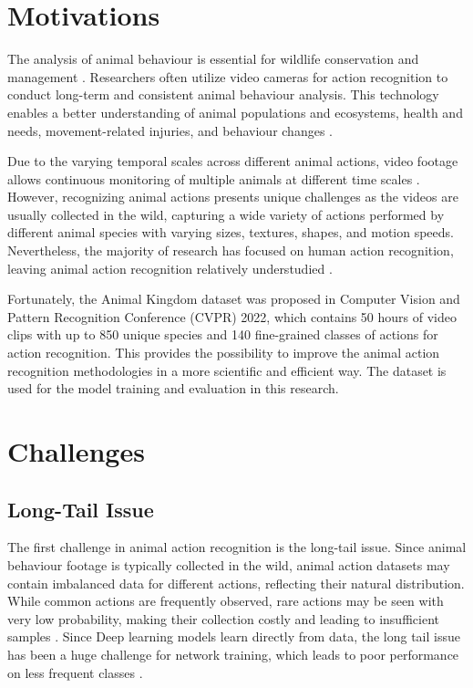 \section{Motivations}
The analysis of animal behaviour is essential for wildlife conservation and management \parencite{Greggor2019, singh2020animal}. Researchers often utilize video cameras for action recognition to conduct long-term and consistent animal behaviour analysis. This technology enables a better understanding of animal populations and ecosystems, health and needs, movement-related injuries, and behaviour changes \parencite{ng2022animal, Giersberg:2022aa, 8259762}.

Due to the varying temporal scales across different animal actions, video footage allows continuous monitoring of multiple animals at different time scales \parencite{ANDERSON201418}. However, recognizing animal actions presents unique challenges as the videos are usually collected in the wild, capturing a wide variety of actions performed by different animal species with varying sizes, textures, shapes, and motion speeds. Nevertheless, the majority of research has focused on human action recognition, leaving animal action recognition relatively understudied \parencite{mondal2023msqnet}.

Fortunately, the Animal Kingdom dataset \parencite{ng2022animal} was proposed in Computer Vision and Pattern Recognition Conference (CVPR) 2022, which contains 50 hours of video clips with up to 850 unique species and 140 fine-grained classes of actions for action recognition. This provides the possibility to improve the animal action recognition methodologies in a more scientific and efficient way. The dataset is used for the model training and evaluation in this research.

\section{Challenges}
\subsection{Long-Tail Issue}
The first challenge in animal action recognition is the long-tail issue. Since animal behaviour footage is typically collected in the wild, animal action datasets may contain imbalanced data for different actions, reflecting their natural distribution. While 
common actions are frequently observed, rare actions may be seen with very low probability, making their collection costly and leading to insufficient samples \parencite{ng2022animal, perrett2023use}. Since Deep learning models learn directly from data, the long tail issue has been a huge challenge for network training, which leads to poor performance on less frequent classes \parencite{cao2019learning, zhang2021videolt}.

